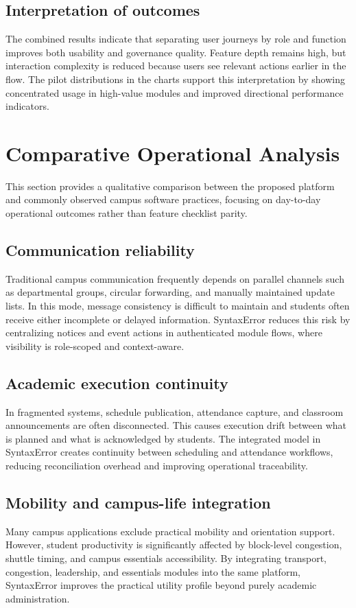 \documentclass[conference]{IEEEtran}
\begin{document}
\subsection{Interpretation of outcomes}
The combined results indicate that separating user journeys by role and function improves both usability and governance quality. Feature depth remains high, but interaction complexity is reduced because users see relevant actions earlier in the flow. The pilot distributions in the charts support this interpretation by showing concentrated usage in high-value modules and improved directional performance indicators.

\section{Comparative Operational Analysis}
This section provides a qualitative comparison between the proposed platform and commonly observed campus software practices, focusing on day-to-day operational outcomes rather than feature checklist parity.

\subsection{Communication reliability}
Traditional campus communication frequently depends on parallel channels such as departmental groups, circular forwarding, and manually maintained update lists. In this mode, message consistency is difficult to maintain and students often receive either incomplete or delayed information. SyntaxError reduces this risk by centralizing notices and event actions in authenticated module flows, where visibility is role-scoped and context-aware.

\subsection{Academic execution continuity}
In fragmented systems, schedule publication, attendance capture, and classroom announcements are often disconnected. This causes execution drift between what is planned and what is acknowledged by students. The integrated model in SyntaxError creates continuity between scheduling and attendance workflows, reducing reconciliation overhead and improving operational traceability.

\subsection{Mobility and campus-life integration}
Many campus applications exclude practical mobility and orientation support. However, student productivity is significantly affected by block-level congestion, shuttle timing, and campus essentials accessibility. By integrating transport, congestion, leadership, and essentials modules into the same platform, SyntaxError improves the practical utility profile beyond purely academic administration.
\end{document}
